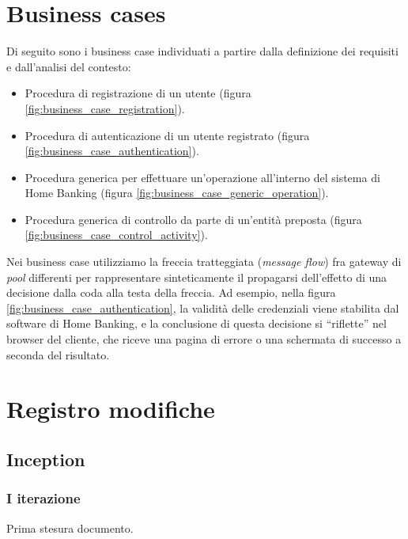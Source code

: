 \documentclass[10pt]{softeng} %
\begin{document}
\startofdocument{}







\section{Business cases}

Di seguito sono i business case individuati a partire dalla definizione dei requisiti e dall'analisi del contesto:
\begin{itemize}
	\item Procedura di registrazione di un utente (figura \ref{fig:business_case_registration}).
	\item Procedura di autenticazione di un utente registrato (figura \ref{fig:business_case_authentication}).
	\item Procedura generica per effettuare un'operazione all'interno del sistema di Home Banking (figura \ref{fig:business_case_generic_operation}).
	\item Procedura generica di controllo da parte di un'entit\`a preposta (figura \ref{fig:business_case_control_activity}).
\end{itemize}
Nei business case utilizziamo la freccia tratteggiata (\emph{message flow}) fra gateway di \emph{pool} differenti per rappresentare sinteticamente il propagarsi dell'effetto di una decisione dalla coda alla testa della freccia.
Ad esempio, nella figura \ref{fig:business_case_authentication}, la validit\`a delle credenziali viene stabilita dal software di Home Banking, e la conclusione di questa decisione si ``riflette'' nel browser del cliente, che riceve una pagina di errore o una schermata di successo a seconda del risultato.

\section{Registro modifiche}

\subsection{Inception}

\subsubsection{I iterazione}

Prima stesura documento.
\end{document}
